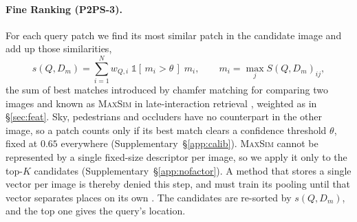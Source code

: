 \paragraph{Fine Ranking (P2PS-3).}
\label{sec:core}
For each query patch we find its most similar patch in the candidate image and add up those similarities,
\begin{equation}\label{eq:stage2}
  s(Q,D_m)=\sum_{i=1}^{N} w_{Q,i}\;\mathbb 1[\,m_i>\theta\,]\;m_i,
  \qquad
  m_i=\max_{j} S(Q,D_m)_{ij},
\end{equation}
the sum of best matches introduced by chamfer matching for comparing two images \citep{chamfer} and known as \textsc{MaxSim} in late-interaction retrieval \citep{colbert}, weighted as in \S\ref{sec:feat}. Sky, pedestrians and occluders have no counterpart in the other image, so a patch counts only if its best match clears a confidence threshold $\theta$, fixed at $0.65$ everywhere (Supplementary~\S\ref{app:calib}). \textsc{MaxSim} cannot be represented by a single fixed-size descriptor per image, so we apply it only to the top-$K$ candidates (Supplementary~\S\ref{app:nofactor}). A method that stores a single vector per image is thereby denied this step, and must train its pooling until that vector separates places on its own \citep{netvlad}. The candidates are re-sorted by $s(Q,D_m)$, and the top one gives the query's location.
